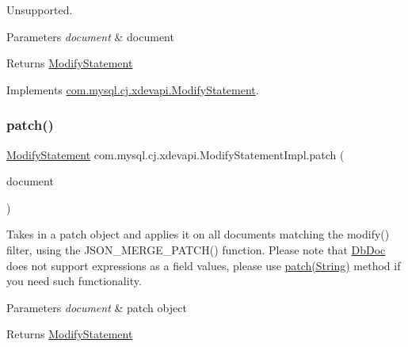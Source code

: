 Unsupported.


\begin{DoxyParams}{Parameters}
{\em document} & document \\
\hline
\end{DoxyParams}
\begin{DoxyReturn}{Returns}
\mbox{\hyperlink{interfacecom_1_1mysql_1_1cj_1_1xdevapi_1_1_modify_statement}{Modify\+Statement}} 
\end{DoxyReturn}


Implements \mbox{\hyperlink{interfacecom_1_1mysql_1_1cj_1_1xdevapi_1_1_modify_statement_a479a30f18124563becbdb944587a35a1}{com.\+mysql.\+cj.\+xdevapi.\+Modify\+Statement}}.

\mbox{\label{classcom_1_1mysql_1_1cj_1_1xdevapi_1_1_modify_statement_impl_a685044daafc9ed7a37d743ac62db9465}} 
\subsubsection{\texorpdfstring{patch()}{patch()}\hspace{0.1cm}{\footnotesize\ttfamily [1/2]}}
{\footnotesize\ttfamily \mbox{\hyperlink{interfacecom_1_1mysql_1_1cj_1_1xdevapi_1_1_modify_statement}{Modify\+Statement}} com.\+mysql.\+cj.\+xdevapi.\+Modify\+Statement\+Impl.\+patch (\begin{DoxyParamCaption}\item[{\mbox{\hyperlink{interfacecom_1_1mysql_1_1cj_1_1xdevapi_1_1_db_doc}{Db\+Doc}}}]{document }\end{DoxyParamCaption})}

Takes in a patch object and applies it on all documents matching the modify() filter, using the J\+S\+O\+N\+\_\+\+M\+E\+R\+G\+E\+\_\+\+P\+A\+T\+C\+H() function. Please note that \mbox{\hyperlink{interfacecom_1_1mysql_1_1cj_1_1xdevapi_1_1_db_doc}{Db\+Doc}} does not support expressions as a field values, please use \mbox{\hyperlink{classcom_1_1mysql_1_1cj_1_1xdevapi_1_1_modify_statement_impl_a67bbbca2a519b79e54c1957e4d2f7c92}{patch(\+String)}} method if you need such functionality.


\begin{DoxyParams}{Parameters}
{\em document} & patch object \\
\hline
\end{DoxyParams}
\begin{DoxyReturn}{Returns}
\mbox{\hyperlink{interfacecom_1_1mysql_1_1cj_1_1xdevapi_1_1_modify_statement}{Modify\+Statement}} 
\end{DoxyReturn}


